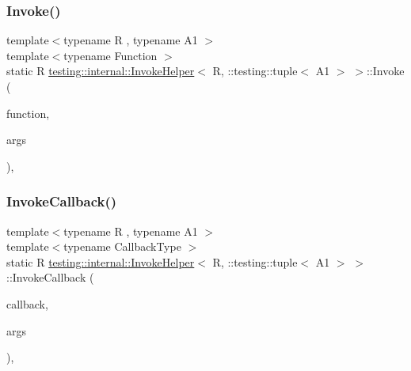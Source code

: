 \subsubsection{\texorpdfstring{Invoke()}{Invoke()}}
{\footnotesize\ttfamily template$<$typename R , typename A1 $>$ \\
template$<$typename Function $>$ \\
static R \mbox{\hyperlink{classtesting_1_1internal_1_1_invoke_helper}{testing\+::internal\+::\+Invoke\+Helper}}$<$ R, \+::testing\+::tuple$<$ A1 $>$ $>$\+::Invoke (\begin{DoxyParamCaption}\item[{\mbox{\hyperlink{structtesting_1_1internal_1_1_function}{Function}}}]{function,  }\item[{const \+::testing\+::tuple$<$ A1 $>$ \&}]{args }\end{DoxyParamCaption})\hspace{0.3cm}{\ttfamily [inline]}, {\ttfamily [static]}}

\mbox{\label{classtesting_1_1internal_1_1_invoke_helper_3_01_r_00_01_1_1testing_1_1tuple_3_01_a1_01_4_01_4_a15660d8fb6fe6ec6b2e030fed772548e}} 
\subsubsection{\texorpdfstring{InvokeCallback()}{InvokeCallback()}}
{\footnotesize\ttfamily template$<$typename R , typename A1 $>$ \\
template$<$typename Callback\+Type $>$ \\
static R \mbox{\hyperlink{classtesting_1_1internal_1_1_invoke_helper}{testing\+::internal\+::\+Invoke\+Helper}}$<$ R, \+::testing\+::tuple$<$ A1 $>$ $>$\+::Invoke\+Callback (\begin{DoxyParamCaption}\item[{Callback\+Type $\ast$}]{callback,  }\item[{const \+::testing\+::tuple$<$ A1 $>$ \&}]{args }\end{DoxyParamCaption})\hspace{0.3cm}{\ttfamily [inline]}, {\ttfamily [static]}}

